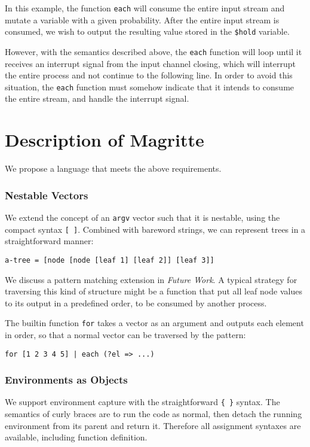 \documentclass[english,preprint,JIP,uplatex]{ipsj}
\begin{document}
\noindent
In this example, the function \verb/each/ will consume the entire input stream and mutate a variable with a given probability. After the entire input stream is consumed, we wish to output the resulting value stored in the \verb/$hold/ variable.

However, with the semantics described above, the \verb/each/ function will loop until it receives an interrupt signal from the input channel closing, which will interrupt the entire process and not continue to the following line. In order to avoid this situation, the \verb/each/ function must somehow indicate that it intends to consume the entire stream, and handle the interrupt signal.

\section{Description of Magritte}\label{description}

We propose a language that meets the above requirements.

\subsubsection{Nestable Vectors}
We extend the concept of an \verb/argv/ vector such that it is nestable, using the compact syntax \verb/[ ]/. Combined with bareword strings, we can represent trees in a straightforward manner:
\begin{lstlisting}
a-tree = [node [node [leaf 1] [leaf 2]] [leaf 3]]
\end{lstlisting}
\noindent
We discuss a pattern matching extension in \emph{Future Work}. A typical strategy for traversing this kind of structure might be a function that put all leaf node values to its output in a predefined order, to be consumed by another process.

The builtin function \verb/for/ takes a vector as an argument and outputs each element in order, so that a normal vector can be traversed by the pattern:
\begin{lstlisting}
for [1 2 3 4 5] | each (?el => ...)
\end{lstlisting}

\subsubsection{Environments as Objects}
We support environment capture with the straightforward \verb/{ }/ syntax. The semantics of curly braces are to run the code as normal, then detach the running environment from its parent and return it. Therefore all assignment syntaxes are available, including function definition.
\end{document}
